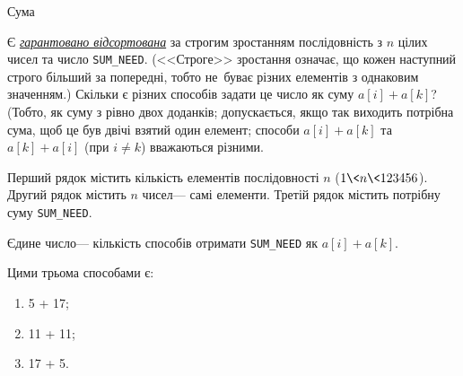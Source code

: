 ﻿\begin{problemAllDefault}{Сума}

Є \underline{\emph{гарантовано відсортована}} за строгим зростанням послідовність з $n$ цілих чисел та число \verb"SUM_NEED". (<<Строге>> зростання означає, що кожен наступний строго більший за попередні, тобто не~буває різних елементів з однаковим значенням.) Скільки є різних способів задати це число як суму ${a[i]+a[k]}$? (Тобто, як суму з рівно двох доданків; допускається, якщо так виходить потрібна сума, щоб це був двічі взятий один елемент; способи ${a[i]+a[k]}$ та ${a[k]+a[i]}$ (при $i{\neq}k$) вважаються різними. 


\InputFile
Перший рядок містить кількість елементів послідовності $n$ ($1{\<}n{\<}123456$). Другий рядок містить $n$ чисел\nolinebreak[3] --- самі елементи. Третій рядок містить потрібну суму \verb"SUM_NEED".

\OutputFile
Єдине число\nolinebreak[3] --- кількість способів отримати \verb"SUM_NEED" як $a[i]+a[k]$. 

\Examples
\noindent\begin{exampleSimple}{10em}{7em}
%
\end{exampleSimple}

\Note
Цими трьома способами є:
\begin{enumerate}
\item	5 + 17;
\item	11 + 11;
\item	17 + 5.
\end{enumerate}

\end{problemAllDefault}
